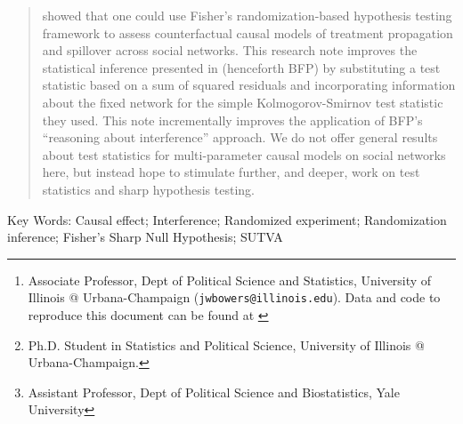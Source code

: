 \documentclass[12pt]{article}
\author{Jake Bowers \thanks{Associate Professor, Dept of Political Science and
		Statistics, University of Illinois @ Urbana-Champaign
		(\texttt{jwbowers@illinois.edu}). Data and code to reproduce this document
	can be found at \citet{bowers2016dataverse}} \and Mark Fredrickson \thanks{Ph.D. Student in Statistics and Political Science, University of Illinois @ Urbana-Champaign.} \and Peter M. Aronow \thanks{Assistant Professor, Dept of Political Science and Biostatistics, Yale University}}
\begin{document}


\begin{titlepage}
\maketitle
\thispagestyle{empty}

\begin{abstract} 
\citet{bowers2013sutva} showed that one could use Fisher's randomization-based
hypothesis testing framework to assess counterfactual causal models of
treatment propagation and spillover across social networks.  This research
note improves the statistical inference presented in \citet{bowers2013sutva}
(henceforth BFP) by substituting a test statistic based on a sum of squared
residuals and incorporating information about the fixed network for the simple
Kolmogorov-Smirnov test statistic  \citep[\S 5.4]{MylesHollander1999a}
they used. This note incrementally improves
the application of BFP's ``reasoning about interference'' approach. We do not
offer general results about test statistics for multi-parameter causal models on social
networks here, but instead hope to stimulate further,
and deeper, work on test statistics and sharp hypothesis testing.
\end{abstract}

Key Words: Causal effect; Interference; Randomized experiment;
Randomization inference; Fisher's Sharp Null Hypothesis; SUTVA


\end{titlepage}

%


\end{document}
